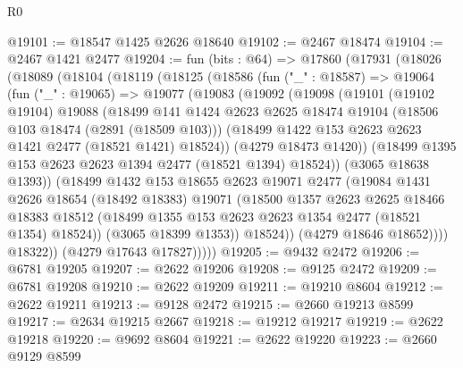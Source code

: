 \begin{lexlean}{R0}
\begin{coremodule}
@19101 := @18547 @1425 @2626 @18640
@19102 := @2467 @18474
@19104 := @2467 @1421 @2477
@19204 := fun (bits : @64) =>
  @17860
    (@17931
      (@18026
        (@18089
          (@18104
            (@18119
              (@18125
                (@18586
                  (fun ("_" : @18587) =>
                  @19064
                    (fun ("_" : @19065) =>
                    @19077
                      (@19083
                        (@19092
                          (@19098
                            (@19101
                              (@19102 @19104)
                              @19088
                              (@18499
                                @141
                                @1424
                                @2623
                                @2625
                                @18474
                                @19104
                                (@18506 @103 @18474 (@2891 (@18509 @103)))
                                (@18499 @1422 @153 @2623 @2623 @1421 @2477 (@18521 @1421) @18524))
                              (@4279 @18473 @1420))
                            (@18499 @1395 @153 @2623 @2623 @1394 @2477 (@18521 @1394) @18524))
                          (@3065 @18638 @1393))
                        (@18499
                          @1432
                          @153
                          @18655
                          @2623
                          @19071
                          @2477
                          (@19084
                            @1431
                            @2626
                            @18654
                            (@18492 @18383)
                            @19071
                            (@18500
                              @1357
                              @2623
                              @2625
                              @18466
                              @18383
                              @18512
                              (@18499 @1355 @153 @2623 @2623 @1354 @2477 (@18521 @1354) @18524))
                            (@3065 @18399 @1353))
                          @18524))
                      (@4279 @18646 @18652))))
                @18322))
            (@4279 @17643 @17827)))))
@19205 := @9432 @2472
@19206 := @6781 @19205
@19207 := @2622 @19206
@19208 := @9125 @2472
@19209 := @6781 @19208
@19210 := @2622 @19209
@19211 := @19210 @8604
@19212 := @2622 @19211
@19213 := @9128 @2472
@19215 := @2660 @19213 @8599
@19217 := @2634 @19215 @2667
@19218 := @19212 @19217
@19219 := @2622 @19218
@19220 := @9692 @8604
@19221 := @2622 @19220
@19223 := @2660 @9129 @8599

\end{coremodule}
\end{lexlean}
